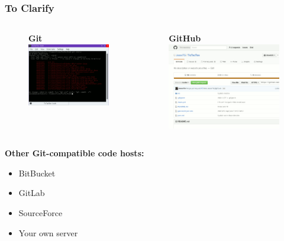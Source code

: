 \documentclass[glossy]{beamer}
\begin{document}
\begin{frame}[fragile=singleslide]
  \frametitle{To Clarify}

  \begin{columns}[t]
    \begin{column}{6cm}
      \begin{figure}
        \centering
        \textbf{Git}
        \includegraphics[width=.9\columnwidth]{git}
      \end{figure}
    \end{column}

    \begin{column}{6cm}
      \begin{figure}
        \centering
        \textbf{GitHub}
        \includegraphics[width=.9\columnwidth]{github}
      \end{figure}
    \end{column}
  \end{columns}
  \hfill \break
  \textbf{Other Git-compatible code hosts:}
  \begin{itemize}
    \item BitBucket
    \item GitLab
    \item SourceForce
    \item Your own server
  \end{itemize}
\end{frame}
\end{document}
